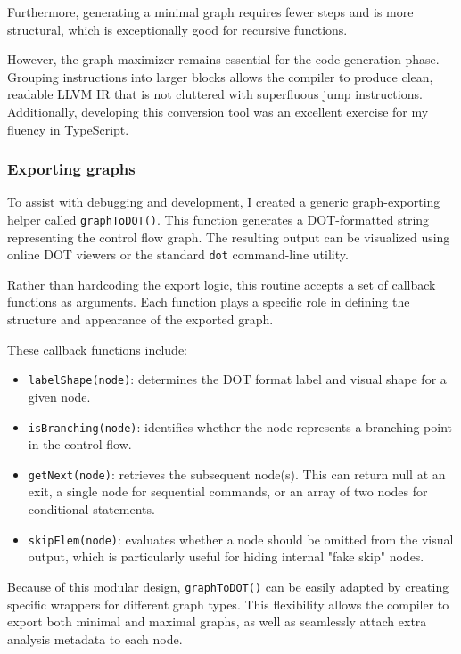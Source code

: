 \documentclass[12pt]{article}
\newcommand{\Code}[1]{\texttt{#1}}
\begin{document}
Furthermore, generating a minimal graph requires fewer steps and is more
structural, which is exceptionally good for recursive functions.

However, the graph maximizer remains essential for the code generation phase.
Grouping instructions into larger blocks allows the compiler to produce clean,
readable LLVM IR that is not cluttered with superfluous jump instructions.
Additionally, developing this conversion tool was an excellent exercise for my
fluency in TypeScript.

\subsubsection{Exporting graphs}

To assist with debugging and development, I created a generic graph-exporting
helper called \Code{graphToDOT()}. This function generates a DOT-formatted
string representing the control flow graph. The resulting output can be
visualized using online DOT viewers or the standard \texttt{dot} command-line
utility.

Rather than hardcoding the export logic, this routine accepts a set of callback
functions as arguments. Each function plays a specific role in defining the
structure and appearance of the exported graph.

These callback functions include:
\begin{itemize}
    \item \Code{labelShape(node)}: determines the DOT format label and visual
        shape for a given node.
    \item \Code{isBranching(node)}: identifies whether the node represents a
        branching point in the control flow.
    \item \Code{getNext(node)}: retrieves the subsequent node(s). This can
        return null at an exit, a single node for sequential commands, or an
        array of two nodes for conditional statements.
    \item \Code{skipElem(node)}: evaluates whether a node should be omitted from
        the visual output, which is particularly useful for hiding internal
        "fake skip" nodes.
\end{itemize}

Because of this modular design, \Code{graphToDOT()} can be easily adapted by
creating specific wrappers for different graph types. This flexibility allows
the compiler to export both minimal and maximal graphs, as well as seamlessly
attach extra analysis metadata to each node.
\end{document}
